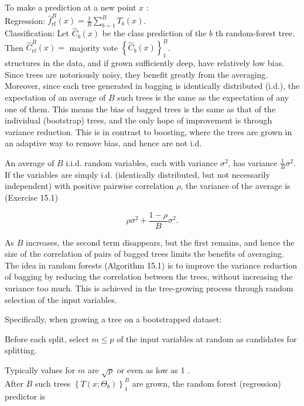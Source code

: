 \documentclass[10pt]{article}
\begin{document}
To make a prediction at a new point $x$ :\\
Regression: $\hat{f}_{\mathrm{rf}}^{B}(x)=\frac{1}{B} \sum_{b=1}^{B} T_{b}(x)$.\\
Classification: Let $\hat{C}_{b}(x)$ be the class prediction of the $b$ th random-forest tree. Then $\hat{C}_{\mathrm{rf}}^{B}(x)=$ majority vote $\left\{\hat{C}_{b}(x)\right\}_{1}^{B}$.\\
structures in the data, and if grown sufficiently deep, have relatively low bias. Since trees are notoriously noisy, they benefit greatly from the averaging. Moreover, since each tree generated in bagging is identically distributed (i.d.), the expectation of an average of $B$ such trees is the same as the expectation of any one of them. This means the bias of bagged trees is the same as that of the individual (bootstrap) trees, and the only hope of improvement is through variance reduction. This is in contrast to boosting, where the trees are grown in an adaptive way to remove bias, and hence are not i.d.

An average of $B$ i.i.d. random variables, each with variance $\sigma^{2}$, has variance $\frac{1}{B} \sigma^{2}$. If the variables are simply i.d. (identically distributed, but not necessarily independent) with positive pairwise correlation $\rho$, the variance of the average is (Exercise 15.1)


\begin{equation*}
\rho \sigma^{2}+\frac{1-\rho}{B} \sigma^{2} . \tag{15.1}
\end{equation*}


As $B$ increases, the second term disappears, but the first remains, and hence the size of the correlation of pairs of bagged trees limits the benefits of averaging. The idea in random forests (Algorithm 15.1) is to improve the variance reduction of bagging by reducing the correlation between the trees, without increasing the variance too much. This is achieved in the tree-growing process through random selection of the input variables.

Specifically, when growing a tree on a bootstrapped dataset:

Before each split, select $m \leq p$ of the input variables at random as candidates for splitting.

Typically values for $m$ are $\sqrt{p}$ or even as low as 1 .\\
After $B$ such trees $\left\{T\left(x ; \Theta_{b}\right)\right\}_{1}^{B}$ are grown, the random forest (regression) predictor is
\end{document}
